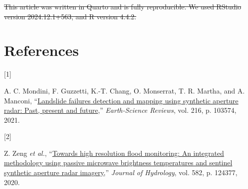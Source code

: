 \documentclass[
  lettersize  journal,
]{IEEEtran}%
\newlength{\cslhangindent}
\newlength{\csllabelwidth}
\newenvironment{CSLReferences}[2] %
 {\begin{list}{}{%
  \setlength{\itemindent}{0pt}
  \setlength{\leftmargin}{0pt}
  \setlength{\parsep}{0pt}
  \ifodd #1
   \setlength{\leftmargin}{\cslhangindent}
   \setlength{\itemindent}{-1\cslhangindent}
  \fi
  \setlength{\itemsep}{#2\baselineskip}}}
 {\end{list}}
\newcommand{\CSLLeftMargin}[1]{\parbox[t]{\csllabelwidth}{\strut#1\strut}}
\newcommand{\CSLRightInline}[1]{\parbox[t]{\linewidth - \csllabelwidth}{\strut#1\strut}}
\providecommand{\DIFdeltex}[1]{{\protect\color{red}\sout{#1}}} %
\providecommand{\DIFaddbegin}{} %
\providecommand{\DIFaddend}{} %
\providecommand{\DIFdelbegin}{} %
\providecommand{\DIFdelend}{} %
\providecommand{\DIFdel}[1]{\texorpdfstring{\DIFdeltex{#1}}{}} %
\newcommand{\DIFscaledelfig}{0.5}
\newlength{\DIFdelgraphicswidth} %
\newlength{\DIFdelgraphicsheight} %
\newcommand{\DIFaddincludegraphics}[2][]{{\color{blue}\fbox{\DIFOincludegraphics[#1]{#2}}}} %
\newcommand{\DIFdelincludegraphics}[2][]{%
\sbox{\DIFdelgraphicsbox}{\DIFOincludegraphics[#1]{#2}}%
\settoboxwidth{\DIFdelgraphicswidth}{\DIFdelgraphicsbox} %
\settoboxtotalheight{\DIFdelgraphicsheight}{\DIFdelgraphicsbox} %
\scalebox{\DIFscaledelfig}{%
\parbox[b]{\DIFdelgraphicswidth}{\usebox{\DIFdelgraphicsbox}\\[-\baselineskip] \rule{\DIFdelgraphicswidth}{0em}}\llap{\resizebox{\DIFdelgraphicswidth}{\DIFdelgraphicsheight}{%
\setlength{\unitlength}{\DIFdelgraphicswidth}%
\begin{picture}(1,1)%
\thicklines\linethickness{2pt} %
{\color[rgb]{1,0,0}\put(0,0){\framebox(1,1){}}}%
{\color[rgb]{1,0,0}\put(0,0){\line( 1,1){1}}}%
{\color[rgb]{1,0,0}\put(0,1){\line(1,-1){1}}}%
\end{picture}%
}\hspace*{3pt}}} %
} %
\DeclareRobustCommand{\DIFaddbegin}{\DIFOaddbegin \let\includegraphics\DIFaddincludegraphics} %
\DeclareRobustCommand{\DIFaddend}{\DIFOaddend \let\includegraphics\DIFOincludegraphics} %
\DeclareRobustCommand{\DIFdelbegin}{\DIFOdelbegin \let\includegraphics\DIFdelincludegraphics} %
\DeclareRobustCommand{\DIFdelend}{\DIFOaddend \let\includegraphics\DIFOincludegraphics} %
\begin{document}
\DIFdel{This article was written in Quarto and is fully reproducible. We used
RStudio version 2024.12.1+563, and R version 4.4.2.
}%

\DIFdelend \section*{References}\label{references}

\label{refs}
\begin{CSLReferences}{0}{0}
\DIFdelbegin {}
\DIFdelend \DIFaddbegin {}
\DIFaddend \CSLLeftMargin{{[}1{]} }%
\DIFdelbegin %
\DIFdelend \DIFaddbegin \CSLRightInline{A. C. Mondini, F. Guzzetti, K.-T. Chang, O. Monserrat,
T. R. Martha, and A. Manconi,
{``\href{https://doi.org/10.1016/j.earscirev.2021.103574}{Landslide
failures detection and mapping using synthetic aperture radar: Past,
present and future},''} \emph{Earth-Science Reviews}, vol. 216, p.
103574, 2021. }
\DIFaddend 

\DIFdelbegin {}
\DIFdelend \DIFaddbegin {}
\DIFaddend \CSLLeftMargin{{[}2{]} }%
\DIFdelbegin %
\DIFdelend \DIFaddbegin \CSLRightInline{Z. Zeng \emph{et al.},
{``\href{https://doi.org/10.1016/j.jhydrol.2019.124377}{Towards high
resolution flood monitoring: An integrated methodology using passive
microwave brightness temperatures and sentinel synthetic aperture radar
imagery},''} \emph{Journal of Hydrology}, vol. 582, p. 124377, 2020. }
\DIFaddend 


\end{CSLReferences}
\end{document}
